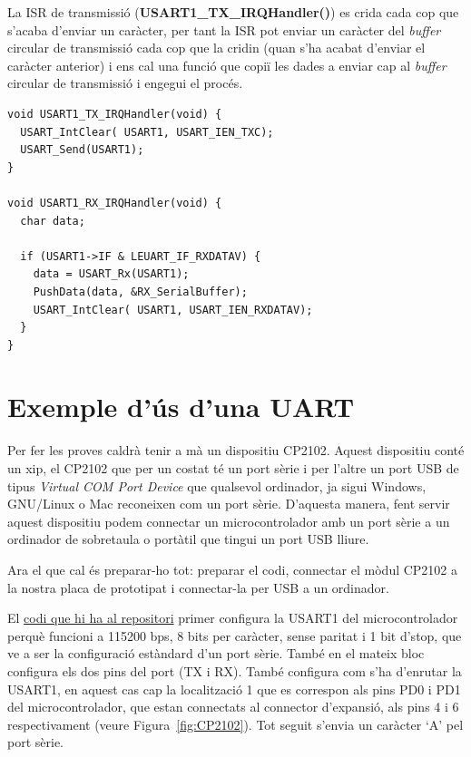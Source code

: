 La ISR de transmissió ({\bf USART1\_TX\_IRQHandler()}) es crida cada cop que s'acaba d'enviar un caràcter, per tant la ISR pot enviar un caràcter del {\em buffer} circular de transmissió cada cop que la cridin (quan s'ha acabat d'enviar el caràcter anterior) i ens cal una funció que copiï les dades a enviar cap al {\em buffer} circular de transmissió i engegui el procés.

\begin{lstlisting}[style=customc,caption={ISRs de TX i RX de la UART},label=UARTISRs]
void USART1_TX_IRQHandler(void) {
  USART_IntClear( USART1, USART_IEN_TXC);
  USART_Send(USART1);
}

void USART1_RX_IRQHandler(void) {
  char data;

  if (USART1->IF & LEUART_IF_RXDATAV) {
    data = USART_Rx(USART1);
    PushData(data, &RX_SerialBuffer);
    USART_IntClear( USART1, USART_IEN_RXDATAV);
  }
}
\end{lstlisting}



\section{Exemple d'ús d'una UART}
\label{sub:UART_example}
Per fer les proves caldrà tenir a mà un dispositiu \gls{CP2102}. Aquest dispositiu conté un xip, el CP2102 que per un costat té un port sèrie i per l'altre un port USB de tipus {\em Virtual COM Port Device} que qualsevol ordinador, ja sigui Windows, GNU/Linux o Mac reconeixen com un port sèrie. D'aquesta manera, fent servir aquest dispositiu podem connectar un microcontrolador amb un port sèrie a un ordinador de sobretaula o portàtil que tingui un port \gls{USB} lliure.

Ara el que cal és preparar-ho tot: preparar el codi, connectar el mòdul CP2102 a la nostra placa de prototipat i connectar-la per USB a un ordinador.

El \href{https://github.com/mariusmm/cursembedded/tree/master/Simplicity/UART_1}{codi que hi ha al repositori} primer configura la USART1 del microcontrolador perquè funcioni a 115200 bps, 8 bits per caràcter, sense paritat i 1 bit d'stop, que ve a ser la configuració estàndard d'un port sèrie. També en el mateix bloc configura els dos pins del port (TX i RX). També configura com s'ha d'enrutar la USART1, en aquest cas cap la localització 1 que es correspon als pins PD0 i PD1 del microcontrolador, que estan connectats al connector d'expansió, als pins 4 i 6 respectivament (veure Figura~\ref{fig:CP2102}). Tot seguit s'envia un caràcter ‘A' pel port sèrie.


